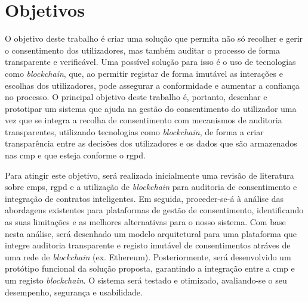 \section{Objetivos}

O objetivo deste trabalho é criar uma solução que permita não só recolher e gerir o consentimento dos utilizadores, mas também auditar o processo de forma transparente e verificável. Uma possível solução para isso é o uso de tecnologias como \textit{blockchain}, que, ao permitir registar de forma imutável as interações e escolhas dos utilizadores, pode assegurar a conformidade e aumentar a confiança no processo. O principal objetivo deste trabalho é, portanto, desenhar e prototipar um sistema que ajuda na gestão do consentimento do utilizador uma vez que se integra a recolha de consentimento com mecanismos de auditoria transparentes, utilizando tecnologias como \textit{blockchain}, de forma a criar transparência entre as decisões dos utilizadores e os dados que são armazenados nas \acrshort{cmp} e que esteja conforme o \acrshort{rgpd}.

Para atingir este objetivo, será realizada inicialmente uma revisão de literatura sobre \acrshort{cmp}s, \acrshort{rgpd} e a utilização de \textit{blockchain} para auditoria de consentimento e integração de contratos inteligentes. Em seguida, proceder-se-á à análise das abordagens existentes para plataformas de gestão de consentimento, identificando as suas limitações e as melhores alternativas para o nosso sistema. Com base nesta análise, será desenhado um modelo arquitetural para uma plataforma que integre auditoria transparente e registo imutável de consentimentos atráves de uma rede de \textit{blockchain} (ex. Ethereum). Posteriormente, será desenvolvido um protótipo funcional da solução proposta, garantindo a integração entre a \acrshort{cmp} e um registo \textit{blockchain}. O sistema será testado e otimizado, avaliando-se o seu desempenho, segurança e usabilidade.
